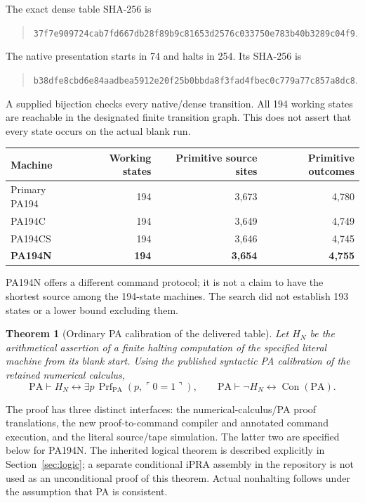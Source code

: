 \documentclass[11pt,letterpaper]{article}
\newcommand{\PA}{\mathrm{PA}}
\newcommand{\Con}{\operatorname{Con}}
\newcommand{\Prf}{\operatorname{Prf}}
\newtheorem{theorem}{Theorem}[section]
\begin{document}
The exact dense table SHA-256 is
\begin{quote}\small
\nolinkurl{37f7e909724cab7fd667db28f89b9c81653d2576c033750e783b40b3289c04f9}.
\end{quote}
The native presentation starts in 74 and halts in 254. Its SHA-256 is
\begin{quote}\small
\nolinkurl{b38dfe8cbd6e84aadbea5912e20f25b0bbda8f3fad4fbec0c779a77c857a8dc8}.
\end{quote}
A supplied bijection checks every native/dense transition. All 194 working
states are reachable in the designated finite transition graph. This does
not assert that every state occurs on the actual blank run.

\begin{center}
\begin{tabular}{@{}lrrr@{}}
\toprule
Machine & Working states & Primitive source sites & Primitive outcomes\\
\midrule
Primary PA194 & 194 & 3,673 & 4,780\\
PA194C & 194 & 3,649 & 4,749\\
PA194CS & 194 & 3,646 & 4,745\\
\textbf{PA194N} & \textbf{194} & \textbf{3,654} & \textbf{4,755}\\
\bottomrule
\end{tabular}
\end{center}
PA194N offers a different command protocol; it is not a claim to have the
shortest source among the 194-state machines. The search did not establish
193 states or a lower bound excluding them.

\begin{theorem}[Ordinary PA calibration of the delivered table]
Let $H_N$ be the arithmetical assertion of a finite halting computation of
the specified literal machine from its blank start. Using the published
syntactic PA calibration of the retained numerical calculus,
\[
 \PA\vdash H_N\leftrightarrow
   \exists p\,\Prf_{\PA}(p,\ulcorner0=1\urcorner),
 \qquad
 \PA\vdash\neg H_N\leftrightarrow\Con(\PA).
\]
\end{theorem}
The proof has three distinct interfaces: the numerical-calculus/PA proof
translations, the new proof-to-command compiler and annotated command
execution, and the literal source/tape simulation. The latter two are
specified below for PA194N. The inherited logical theorem is described
explicitly in Section~\ref{sec:logic}; a separate conditional iPRA assembly
in the repository is not used as an unconditional proof of this theorem.
Actual nonhalting follows under the assumption that PA is consistent.
\end{document}
